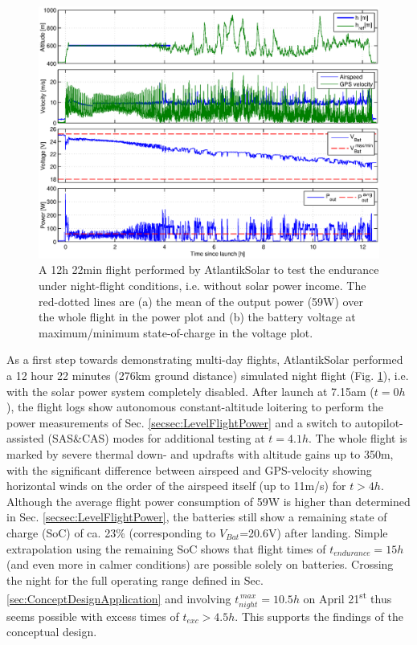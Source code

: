 \begin{figure}[tb]
    \centering
     \includegraphics[width=\linewidth]{images/12hFlight}
    \caption{A 12h 22min flight performed by AtlantikSolar to test the endurance under night-flight conditions, i.e. without solar power income. The red-dotted lines are (a) the mean of the output power (59W) over the whole flight in the power plot and (b) the battery voltage at maximum/minimum state-of-charge in the voltage plot.} 
    \label{fig:12hFlight}
\end{figure}

As a first step towards demonstrating multi-day flights, AtlantikSolar performed a 12 hour 22 minutes (276km ground distance) simulated night flight (Fig. \ref{fig:12hFlight}), i.e. with the solar power system completely disabled. After launch at 7.15am ($t=0h$), the flight logs show autonomous constant-altitude loitering to perform the power measurements of Sec. \ref{secsec:LevelFlightPower} and a switch to autopilot-assisted (SAS\&CAS) modes for additional testing at $t=4.1h$. The whole flight is marked by severe thermal down- and updrafts with altitude gains up to 350m, with the significant difference between airspeed and GPS-velocity showing horizontal winds on the order of the airspeed itself (up to 11m/s) for $t>4h$. Although the average flight power consumption of 59W is higher than determined in Sec. \ref{secsec:LevelFlightPower}, the batteries still show a remaining state of charge (SoC) of ca. 23\% (corresponding to $V_{Bat}$=20.6V) after landing. Simple extrapolation using the remaining SoC shows that flight times of $t_{endurance}=15h$ (and even more in calmer conditions) are possible solely on batteries. Crossing the night for the full operating range defined in Sec. \ref{sec:ConceptDesignApplication} and involving $t_{night}^{\,max}=10.5h$ on April 21\textsuperscript{st} thus seems possible with excess times of $t_{exc}>4.5h$. This supports the findings of the conceptual design. 

